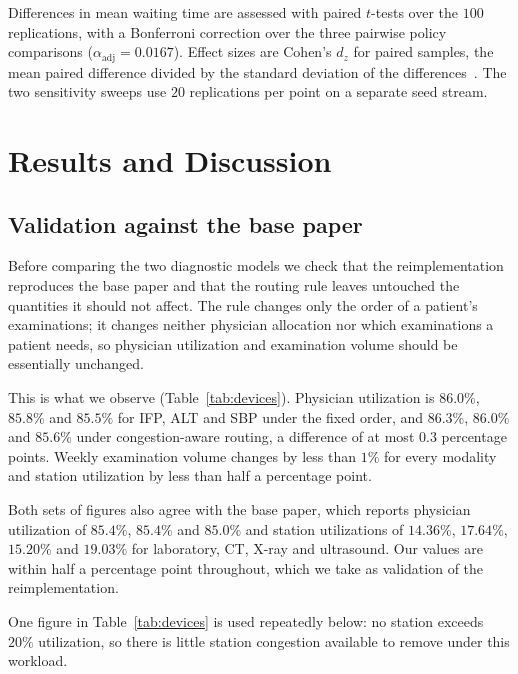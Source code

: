 \documentclass[sigconf]{acmart}
\begin{document}
Differences in mean waiting time are assessed with paired $t$-tests over the
$100$ replications, with a Bonferroni correction over the three pairwise policy
comparisons ($\alpha_{\mathrm{adj}}=0.0167$). Effect sizes are Cohen's $d_z$
for paired samples, the mean paired difference divided by the standard
deviation of the differences~\cite{cohen1988power}. The two sensitivity sweeps
use $20$ replications per point on a separate seed stream.


\section{Results and Discussion}
\label{sec:results}

\subsection{Validation against the base paper}
\label{sec:repro}

Before comparing the two diagnostic models we check that the reimplementation
reproduces the base paper and that the routing rule leaves untouched the
quantities it should not affect. The rule changes only the order of a patient's
examinations; it changes neither physician allocation nor which examinations a
patient needs, so physician utilization and examination volume should be
essentially unchanged.

This is what we observe (Table~\ref{tab:devices}). Physician utilization is
$86.0\%$, $85.8\%$ and $85.5\%$ for IFP, ALT and SBP under the fixed order, and
$86.3\%$, $86.0\%$ and $85.6\%$ under congestion-aware routing, a difference of
at most $0.3$ percentage points. Weekly examination volume changes by less than
$1\%$ for every modality and station utilization by less than half a percentage
point.

Both sets of figures also agree with the base paper, which reports physician
utilization of $85.4\%$, $85.4\%$ and $85.0\%$ and station utilizations of
$14.36\%$, $17.64\%$, $15.20\%$ and $19.03\%$ for laboratory, CT, X-ray and
ultrasound. Our values are within half a percentage point throughout, which we
take as validation of the reimplementation.

One figure in Table~\ref{tab:devices} is used repeatedly below: no station
exceeds $20\%$ utilization, so there is little station congestion available to
remove under this workload.
\end{document}
